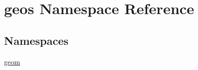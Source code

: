 \hypertarget{namespacegeos}{}\section{geos Namespace Reference}
\label{namespacegeos}
\subsection*{Namespaces}
\begin{DoxyCompactItemize}
\item 
 \hyperlink{namespacegeos_1_1geom}{geom}
\end{DoxyCompactItemize}

